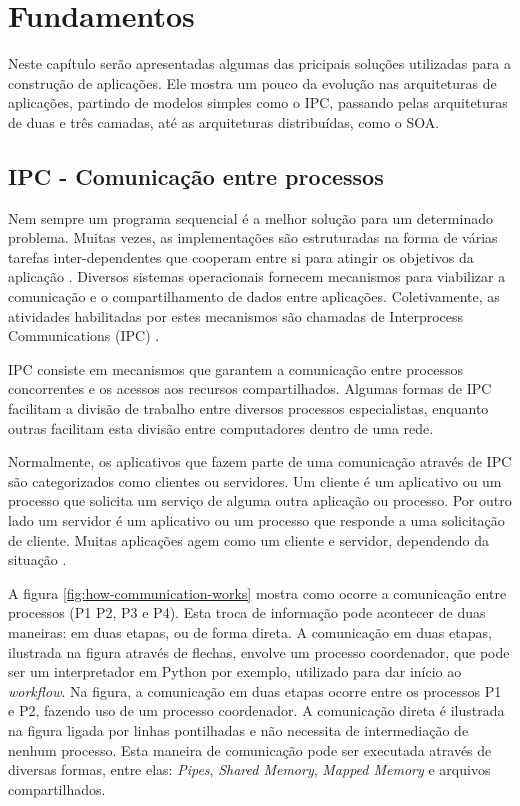 \chapter[Fundamentos]{Fundamentos}

Neste capítulo serão apresentadas algumas das pricipais soluções utilizadas para a construção de aplicações. Ele mostra um pouco da evolução nas arquiteturas de aplicações, partindo de modelos simples como o IPC, passando pelas arquiteturas de duas e três camadas, até as arquiteturas distribuídas, como o SOA. 


\section{IPC - Comunicação entre processos}\label{sec:ipc}

Nem sempre um programa sequencial é a melhor solução para um determinado problema. Muitas vezes, as implementações são estruturadas na forma de várias tarefas inter-dependentes que cooperam entre si para atingir os objetivos da aplicação \cite{sistemas-op-mazierro}. Diversos sistemas operacionais fornecem mecanismos para viabilizar a comunicação e o compartilhamento de dados entre aplicações. Coletivamente, as atividades habilitadas por estes mecanismos são chamadas de Interprocess Communications (IPC) \cite{microsoft-ipc}.

IPC consiste em mecanismos que garantem a comunicação entre processos concorrentes e os acessos aos recursos compartilhados. Algumas formas de IPC facilitam a divisão de trabalho entre diversos processos especialistas, enquanto outras facilitam esta divisão entre computadores dentro de uma rede.

Normalmente, os aplicativos que fazem parte de uma comunicação através de IPC são categorizados como clientes ou servidores. Um cliente é um aplicativo ou um processo que solicita um serviço de alguma outra aplicação ou processo. Por outro lado um servidor é um aplicativo ou um processo que responde a uma solicitação de cliente. Muitas aplicações agem como um cliente e servidor, dependendo da situação \cite{microsoft-ipc}.

A figura \ref{fig:how-communication-works} mostra como ocorre a comunicação entre processos (P1 P2, P3 e P4). Esta troca de informação pode acontecer de duas maneiras: em duas etapas, ou de forma direta. A comunicação em duas etapas, ilustrada na figura através de flechas, envolve um processo coordenador, que pode ser um interpretador em Python por exemplo, utilizado para dar início ao \textit{workflow}. Na figura, a comunicação em duas etapas ocorre entre os processos P1 e P2, fazendo uso de um processo coordenador. A comunicação direta é ilustrada na figura ligada por linhas pontilhadas e não necessita de intermediação de nenhum processo. Esta maneira de comunicação pode ser executada através de diversas formas, entre elas: \textit{Pipes}, \textit{Shared Memory}, \textit{Mapped Memory} e arquivos compartilhados.

